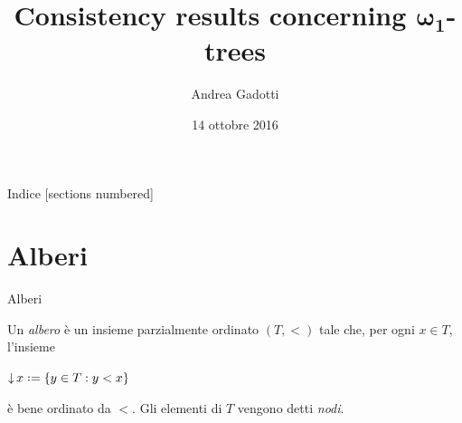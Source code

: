 \documentclass{beamer}
\title{Consistency results concerning $\pmb{\omega_1}$-trees}
\date{14 ottobre 2016}
\author{Andrea Gadotti}
\institute{Università di Torino}
\theoremstyle{num.custom-title}
\theoremstyle{custom-title}
\DeclareMathOperator{\down}{\downarrow}
\newcommand*{\defeq}{\mathrel{\rlap{%
                     \raisebox{0.3ex}{$\cdot$}}%
                     \raisebox{-0.3ex}{$\cdot$}}%
                     =}
\begin{document}
\setlength{\abovedisplayskip}{1pt}
\setlength{\belowdisplayskip}{1pt}
\setlength{\abovedisplayshortskip}{1pt}
\setlength{\belowdisplayshortskip}{1pt}

\maketitle

\begin{frame}{Indice}
[sections numbered]
\tableofcontents[hideallsubsections]
\end{frame}

\section{Alberi}

\begin{frame}{Alberi}

\begin{definition}
Un \emph{albero} è un insieme parzialmente ordinato $(T,<)$ tale che, per ogni $x \in T$, l'insieme
\begin{center}
$\down x \defeq \{y \in T : y < x\}$
\end{center}
è bene ordinato da $<$. Gli elementi di $T$ vengono detti \emph{nodi}. 
\end{definition}

\end{frame}
\end{document}
